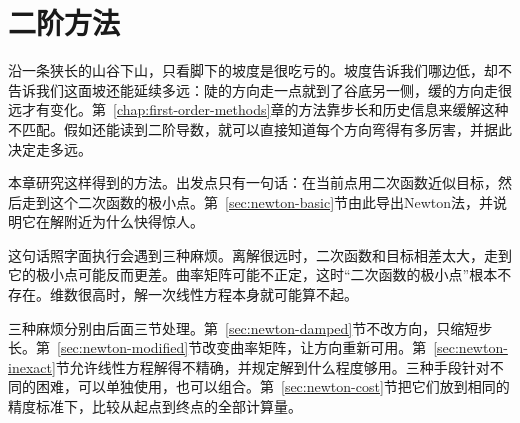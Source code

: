 \chapter{二阶方法}
\label{chap:second-order-methods}

沿一条狭长的山谷下山，只看脚下的坡度是很吃亏的。坡度告诉我们哪边低，却不告诉我们这面坡还能延续多远：陡的方向走一点就到了谷底另一侧，缓的方向走很远才有变化。第~\ref{chap:first-order-methods}章的方法靠步长和历史信息来缓解这种不匹配。假如还能读到二阶导数，就可以直接知道每个方向弯得有多厉害，并据此决定走多远。

本章研究这样得到的方法。出发点只有一句话：在当前点用二次函数近似目标，然后走到这个二次函数的极小点。第~\ref{sec:newton-basic}节由此导出Newton法，并说明它在解附近为什么快得惊人。

这句话照字面执行会遇到三种麻烦。离解很远时，二次函数和目标相差太大，走到它的极小点可能反而更差。曲率矩阵可能不正定，这时“二次函数的极小点”根本不存在。维数很高时，解一次线性方程本身就可能算不起。

三种麻烦分别由后面三节处理。第~\ref{sec:newton-damped}节不改方向，只缩短步长。第~\ref{sec:newton-modified}节改变曲率矩阵，让方向重新可用。第~\ref{sec:newton-inexact}节允许线性方程解得不精确，并规定解到什么程度够用。三种手段针对不同的困难，可以单独使用，也可以组合。第~\ref{sec:newton-cost}节把它们放到相同的精度标准下，比较从起点到终点的全部计算量。







